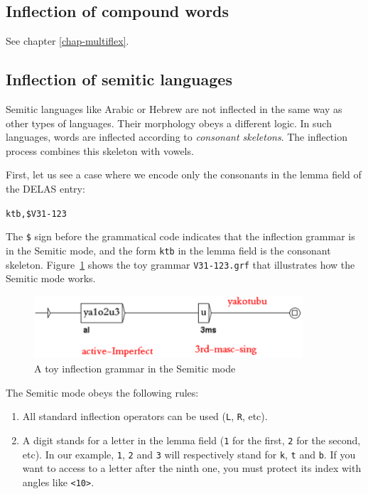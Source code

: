 \subsection{Inflection of compound words}
See chapter \ref{chap-multiflex}.

\subsection{Inflection of semitic languages}
\label{subsection-semitic-inflection}
Semitic languages like Arabic or Hebrew are not inflected in the same way as 
other types of languages. Their morphology obeys a different logic. In
 such languages, words are inflected according to \textit{consonant
skeletons}. The
inflection process combines this skeleton with vowels.

\bigskip
\noindent First, let us see a case where we encode only the consonants in the lemma field of the DELAS  entry:

\bigskip
\noindent \verb+ktb,$V31-123+

\bigskip
\noindent The \verb+$+ sign before the grammatical code indicates that the inflection grammar 
is in the Semitic mode, and the form \verb+ktb+ in the lemma field is the consonant
skeleton. Figure~\ref{semitic-grammar} shows the toy grammar \verb+V31-123.grf+
that illustrates how the Semitic mode works.  

\bigskip
\begin{figure}[!ht]
\begin{center}
\includegraphics[width=10cm]{resources/img/fig3-15.png}
\caption{A toy inflection grammar\label{semitic-grammar} in the Semitic mode}
\end{center}
\end{figure}

\bigskip
\noindent The Semitic mode obeys the following rules:
\begin{enumerate}
  \item All standard inflection operators can be used (\verb+L+, \verb+R+, etc).
  \item A digit stands for a letter in the lemma field (\verb+1+ for the first,
  \verb+2+ for the second, etc). In our example, \verb+1+, \verb+2+ and
  \verb+3+ will respectively stand for \verb+k+, \verb+t+ and
  \verb+b+. If you want to access to a letter after the ninth one, you must
  protect its index with angles like \verb+<10>+.
\end{enumerate}  


